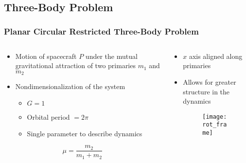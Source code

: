
\section*{}
\subsection*{Three-Body Problem}  
\begin{frame} %
\frametitle{Planar Circular Restricted Three-Body Problem}
	\begin{columns}[T]
	\begin{column}{0.5\textwidth}
  		\begin{itemize}
  			\item Motion of spacecraft \( P\) under the mutual gravitational attraction of two primaries \( m_1 \) and \( m_2 \)
			\item Nondimensionalization of the system
			\begin{itemize}
				\item \(G = 1\)
				\item Orbital period \( = 2\pi\)
				\item Single parameter to describe dynamics
			\end{itemize}	
					
 		\end{itemize}
 	\begin{equation*}
		\mu = \frac{m_2}{m_1+m_2}
		\label{eq:mass_param}
	\end{equation*}
	\end{column}
	\begin{column}[T]{0.5\textwidth}
		\begin{itemize}
			\item  \(x\) axis aligned along primaries
			\item Allows for greater structure in the dynamics
		\begin{figure}[htbp]%
        	\texttt{[image: rot\_frame]}%
		\end{figure}%
		\end{itemize}
	\end{column}
	\end{columns}
	
\end{frame}   %

